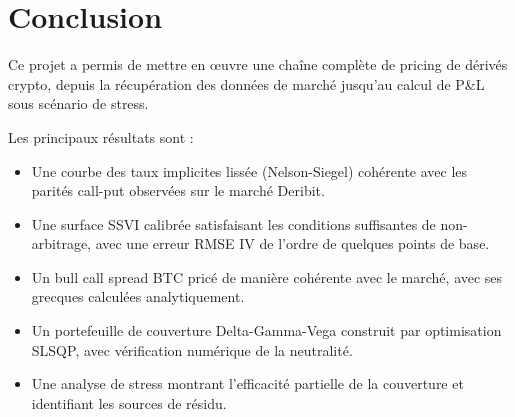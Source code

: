 \section{Conclusion}
\label{sec:conclusion}

Ce projet a permis de mettre en œuvre une chaîne complète de pricing de
dérivés crypto, depuis la récupération des données de marché jusqu'au
calcul de P\&L sous scénario de stress.

Les principaux résultats sont :
\begin{itemize}
  \item Une courbe des taux implicites lissée (Nelson-Siegel) cohérente
    avec les parités call-put observées sur le marché Deribit.
  \item Une surface SSVI calibrée satisfaisant les conditions suffisantes
    de non-arbitrage, avec une erreur RMSE IV de l'ordre de quelques points
    de base.
  \item Un bull call spread BTC pricé de manière cohérente avec le marché,
    avec ses grecques calculées analytiquement.
  \item Un portefeuille de couverture Delta-Gamma-Vega construit par
    optimisation SLSQP, avec vérification numérique de la neutralité.
  \item Une analyse de stress montrant l'efficacité partielle de la
    couverture et identifiant les sources de résidu.
\end{itemize}
